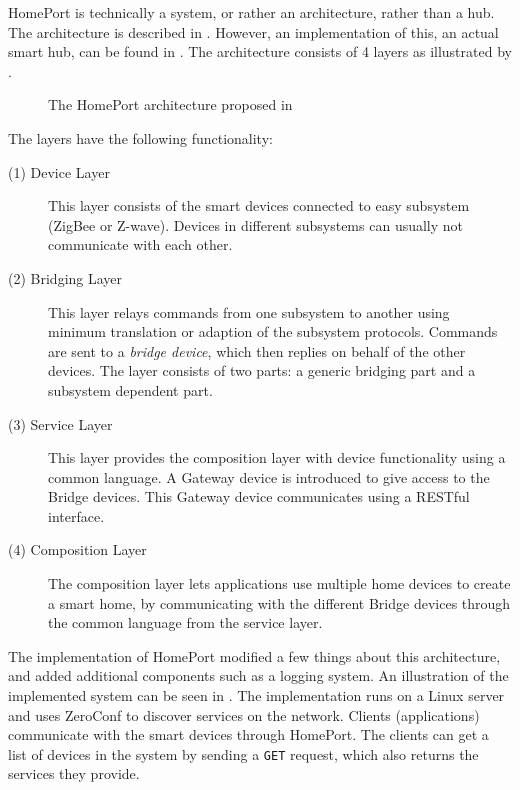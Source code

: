 HomePort is technically a system, or rather an architecture, rather than a hub. 
The architecture is described in \cite{HOMEPORT10}. 
However, an implementation of this, \ie an actual smart hub, can be found in \cite{HOMEPORT13}. 
The architecture consists of \num{4} layers as illustrated by .

\begin{figure}[!htb]
    \centering
    
    \caption{The HomePort architecture proposed in \protect\cite{HOMEPORT10}}
    \label{fig:homeport}
\end{figure}

The layers have the following functionality:
\begin{description}
    \item[(1) Device Layer] This layer consists of the smart devices connected to easy subsystem (\eg ZigBee or Z-wave). Devices in different subsystems can usually not communicate with each other.
    \item[(2) Bridging Layer] This layer relays commands from one subsystem to another using minimum translation or adaption of the subsystem protocols. Commands are sent to a \emph{bridge device}, which then replies on behalf of the other devices. The layer consists of two parts: a generic bridging part and a subsystem dependent part. 
    \item[(3) Service Layer] This layer provides the composition layer with device functionality using a common language. A Gateway device is introduced to give access to the Bridge devices. This Gateway device communicates using a RESTful interface. 
    \item[(4) Composition Layer] The composition layer lets applications use multiple home devices to create a smart home, by communicating with the different Bridge devices through the common language from the service layer. 
\end{description}

The implementation of HomePort modified a few things about this architecture, 
and added additional components such as a logging system. 
An illustration of the implemented system can be seen in .
The implementation runs on a Linux server and uses ZeroConf to discover services on the network. 
Clients (\eg applications) communicate with the smart devices through HomePort. 
The clients can get a list of devices in the system by sending a \texttt{GET} request, 
which also returns the services they provide. 

